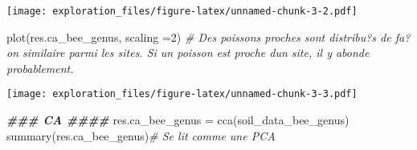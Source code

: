 \documentclass[
]{article}
\newenvironment{Shaded}{\begin{snugshade}}{\end{snugshade}}
\newcommand{\AttributeTok}[1]{\textcolor[rgb]{0.77,0.63,0.00}{#1}}
\newcommand{\CommentTok}[1]{\textcolor[rgb]{0.56,0.35,0.01}{\textit{#1}}}
\newcommand{\DecValTok}[1]{\textcolor[rgb]{0.00,0.00,0.81}{#1}}
\newcommand{\DocumentationTok}[1]{\textcolor[rgb]{0.56,0.35,0.01}{\textbf{\textit{#1}}}}
\newcommand{\FunctionTok}[1]{\textcolor[rgb]{0.00,0.00,0.00}{#1}}
\newcommand{\NormalTok}[1]{#1}
\newcommand{\OtherTok}[1]{\textcolor[rgb]{0.56,0.35,0.01}{#1}}
\begin{document}
\texttt{[image: exploration\_files/figure-latex/unnamed-chunk-3-2.pdf]}

\begin{Shaded}
\begin{Highlighting}[]
\FunctionTok{plot}\NormalTok{(res.ca\_bee\_genus, }\AttributeTok{scaling =}\DecValTok{2}\NormalTok{) }\CommentTok{\# Des poissons proches sont distribu?s de fa?on similaire parmi les sites. Si un poisson est proche d\textquotesingle{}un site, il y abonde probablement.}
\end{Highlighting}
\end{Shaded}

\texttt{[image: exploration\_files/figure-latex/unnamed-chunk-3-3.pdf]}

\begin{Shaded}
\begin{Highlighting}[]
\DocumentationTok{\#\#\# CA \#\#\#\#}
\NormalTok{res.ca\_bee\_genus }\OtherTok{=} \FunctionTok{cca}\NormalTok{(soil\_data\_bee\_genus)}
\FunctionTok{summary}\NormalTok{(res.ca\_bee\_genus)}\CommentTok{\# Se lit comme une PCA}
\end{Highlighting}
\end{Shaded}
\end{document}
